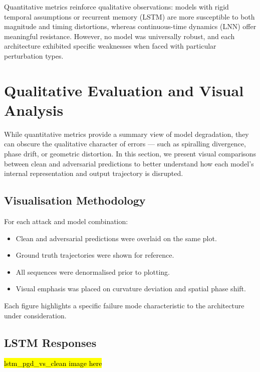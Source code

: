 Quantitative metrics reinforce qualitative observations: models with rigid temporal assumptions or recurrent memory (LSTM) are more susceptible to both magnitude and timing distortions, whereas continuous-time dynamics (LNN) offer meaningful resistance. However, no model was universally robust, and each architecture exhibited specific weaknesses when faced with particular perturbation types.

\section{Qualitative Evaluation and Visual Analysis}

While quantitative metrics provide a summary view of model degradation, they can obscure the qualitative character of errors — such as spiralling divergence, phase drift, or geometric distortion. In this section, we present visual comparisons between clean and adversarial predictions to better understand how each model's internal representation and output trajectory is disrupted.

\subsection*{Visualisation Methodology}

For each attack and model combination:
\begin{itemize}
    \item Clean and adversarial predictions were overlaid on the same plot.
    \item Ground truth trajectories were shown for reference.
    \item All sequences were denormalised prior to plotting.
    \item Visual emphasis was placed on curvature deviation and spatial phase shift.
\end{itemize}

Each figure highlights a specific failure mode characteristic to the architecture under consideration.

\subsection*{LSTM Responses}

\hl{lstm\_pgd\_vs\_clean image here}


